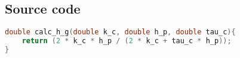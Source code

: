 \documentclass{sig-alternate-05-2015}
\begin{document}
\subsection{Source code}
\begin{lstlisting}[language=C, frame=single, showstringspaces=false]
double calc_h_g(double k_c, double h_p, double tau_c){
    return (2 * k_c * h_p / (2 * k_c + tau_c * h_p));
}
\end{lstlisting}
\end{document}
